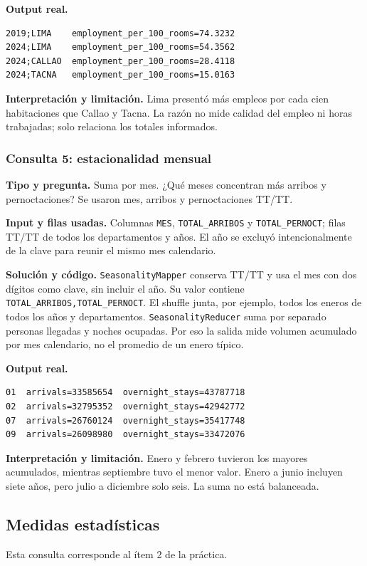 \documentclass[10pt,a4paper]{article}
\theoremstyle{definition}
\begin{document}
\textbf{Output real.}
\begin{lstlisting}[style=resultado]
2019;LIMA    employment_per_100_rooms=74.3232
2024;LIMA    employment_per_100_rooms=54.3562
2024;CALLAO  employment_per_100_rooms=28.4118
2024;TACNA   employment_per_100_rooms=15.0163
\end{lstlisting}
\textbf{Interpretación y limitación.} Lima presentó más empleos por cada cien
habitaciones que Callao y Tacna. La razón no mide calidad del empleo ni horas
trabajadas; solo relaciona los totales informados.

\subsubsection{Consulta 5: estacionalidad mensual}
\textbf{Tipo y pregunta.} Suma por mes. ¿Qué meses concentran más arribos y
pernoctaciones? Se usaron mes, arribos y pernoctaciones TT/TT.

\textbf{Input y filas usadas.} Columnas \texttt{MES}, \texttt{TOTAL\_ARRIBOS} y
\texttt{TOTAL\_PERNOCT}; filas TT/TT de todos los departamentos y años. El año
se excluyó intencionalmente de la clave para reunir el mismo mes calendario.

\textbf{Solución y código.} \texttt{SeasonalityMapper} conserva TT/TT y usa el
mes con dos dígitos como clave, sin incluir el año. Su valor contiene
\texttt{TOTAL\_ARRIBOS,TOTAL\_PERNOCT}. El shuffle junta, por ejemplo, todos los
eneros de todos los años y departamentos. \texttt{SeasonalityReducer} suma por
separado personas llegadas y noches ocupadas. Por eso la salida mide volumen
acumulado por mes calendario, no el promedio de un enero típico.

\textbf{Output real.}
\begin{lstlisting}[style=resultado]
01  arrivals=33585654  overnight_stays=43787718
02  arrivals=32795352  overnight_stays=42942772
07  arrivals=26760124  overnight_stays=35417748
09  arrivals=26098980  overnight_stays=33472076
\end{lstlisting}
\textbf{Interpretación y limitación.} Enero y febrero tuvieron los mayores
acumulados, mientras septiembre tuvo el menor valor. Enero a junio incluyen
siete años, pero julio a diciembre solo seis. La suma no está balanceada.

\subsection{Medidas estadísticas}
Esta consulta corresponde al ítem 2 de la práctica.
\end{document}
